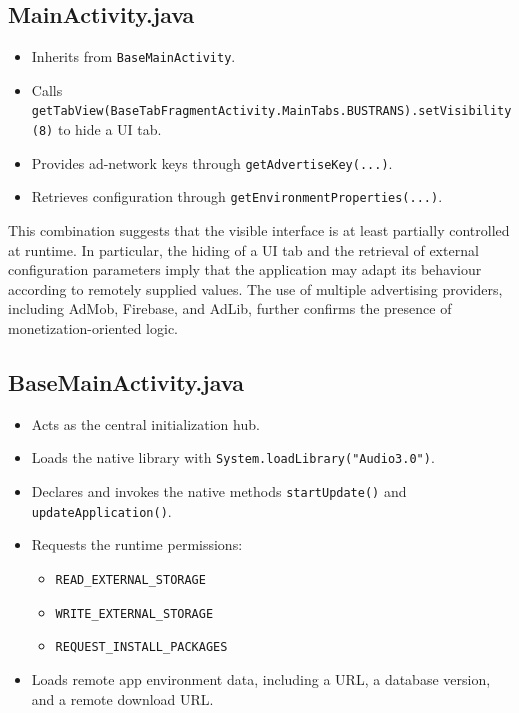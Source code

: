 \subsection{MainActivity.java}
\begin{itemize}
    \item Inherits from \texttt{BaseMainActivity}.
    \item Calls \texttt{getTabView(BaseTabFragmentActivity.MainTabs.BUSTRANS).setVisibility(8)} to hide a UI tab.
    \item Provides ad-network keys through \texttt{getAdvertiseKey(...)}.
    \item Retrieves configuration through \texttt{getEnvironmentProperties(...)}.
\end{itemize}

This combination suggests that the visible interface is at least partially controlled at runtime. In particular, the hiding of a UI tab and the retrieval of external configuration parameters imply that the application may adapt its behaviour according to remotely supplied values.
The use of multiple advertising providers, including AdMob, Firebase, and AdLib, further confirms the presence of monetization-oriented logic.

\subsection{BaseMainActivity.java}
\begin{itemize}
    \item Acts as the central initialization hub.
    \item Loads the native library with \texttt{System.loadLibrary("Audio3.0")}.
    \item Declares and invokes the native methods \texttt{startUpdate()} and \texttt{updateApplication()}.
    \item Requests the runtime permissions:
    \begin{itemize}
        \item \texttt{READ\_EXTERNAL\_STORAGE}
        \item \texttt{WRITE\_EXTERNAL\_STORAGE}
        \item \texttt{REQUEST\_INSTALL\_PACKAGES}
    \end{itemize}
    \item Loads remote app environment data, including a URL, a database version, and a remote download URL.
\end{itemize}

